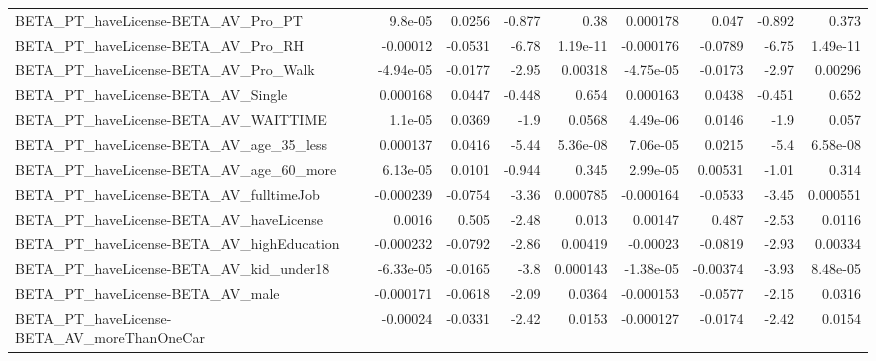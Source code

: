 \begin{tabular}{lrrrrrrrr}
BETA\_PT\_haveLicense-BETA\_AV\_Pro\_PT                 &     9.8e-05 &       0.0256 &   -0.877 &     0.38 &   0.000178 &       0.047 &       -0.892 &         0.373 \\
BETA\_PT\_haveLicense-BETA\_AV\_Pro\_RH                 &    -0.00012 &      -0.0531 &    -6.78 & 1.19e-11 &  -0.000176 &     -0.0789 &        -6.75 &      1.49e-11 \\
BETA\_PT\_haveLicense-BETA\_AV\_Pro\_Walk               &   -4.94e-05 &      -0.0177 &    -2.95 &  0.00318 &  -4.75e-05 &     -0.0173 &        -2.97 &       0.00296 \\
BETA\_PT\_haveLicense-BETA\_AV\_Single                 &    0.000168 &       0.0447 &   -0.448 &    0.654 &   0.000163 &      0.0438 &       -0.451 &         0.652 \\
BETA\_PT\_haveLicense-BETA\_AV\_WAITTIME               &     1.1e-05 &       0.0369 &     -1.9 &   0.0568 &   4.49e-06 &      0.0146 &         -1.9 &         0.057 \\
BETA\_PT\_haveLicense-BETA\_AV\_age\_35\_less            &    0.000137 &       0.0416 &    -5.44 & 5.36e-08 &   7.06e-05 &      0.0215 &         -5.4 &      6.58e-08 \\
BETA\_PT\_haveLicense-BETA\_AV\_age\_60\_more            &    6.13e-05 &       0.0101 &   -0.944 &    0.345 &   2.99e-05 &     0.00531 &        -1.01 &         0.314 \\
BETA\_PT\_haveLicense-BETA\_AV\_fulltimeJob            &   -0.000239 &      -0.0754 &    -3.36 & 0.000785 &  -0.000164 &     -0.0533 &        -3.45 &      0.000551 \\
BETA\_PT\_haveLicense-BETA\_AV\_haveLicense            &      0.0016 &        0.505 &    -2.48 &    0.013 &    0.00147 &       0.487 &        -2.53 &        0.0116 \\
BETA\_PT\_haveLicense-BETA\_AV\_highEducation          &   -0.000232 &      -0.0792 &    -2.86 &  0.00419 &   -0.00023 &     -0.0819 &        -2.93 &       0.00334 \\
BETA\_PT\_haveLicense-BETA\_AV\_kid\_under18            &   -6.33e-05 &      -0.0165 &     -3.8 & 0.000143 &  -1.38e-05 &    -0.00374 &        -3.93 &      8.48e-05 \\
BETA\_PT\_haveLicense-BETA\_AV\_male                   &   -0.000171 &      -0.0618 &    -2.09 &   0.0364 &  -0.000153 &     -0.0577 &        -2.15 &        0.0316 \\
BETA\_PT\_haveLicense-BETA\_AV\_moreThanOneCar         &    -0.00024 &      -0.0331 &    -2.42 &   0.0153 &  -0.000127 &     -0.0174 &        -2.42 &        0.0154 \\

\end{tabular}
